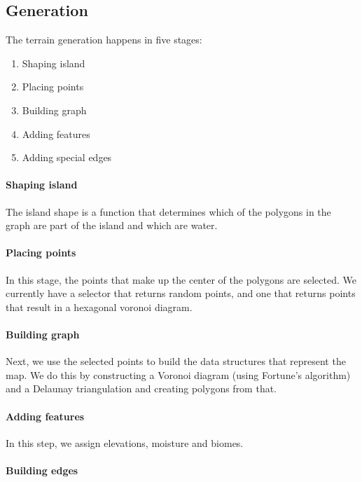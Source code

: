 
\subsection{Generation}

The terrain generation happens in five stages:

\begin{enumerate}
	\item Shaping island
	\item Placing points
	\item Building graph
	\item Adding features
	\item Adding special edges
\end{enumerate}

\paragraph{Shaping island}

The island shape is a function that determines which of the polygons in the graph are part of the island and which are water.

\paragraph{Placing points}

In this stage, the points that make up the center of the polygons are selected.
We currently have a selector that returns random points, and one that returns points that result in a hexagonal voronoi diagram.

\paragraph{Building graph}

Next, we use the selected points to build the data structures that represent the map.
We do this by constructing a Voronoi diagram (using Fortune's algorithm) and a Delaunay triangulation and creating polygons from that.

\paragraph{Adding features}

In this step, we assign elevations, moisture and biomes.

\paragraph{Building edges}

